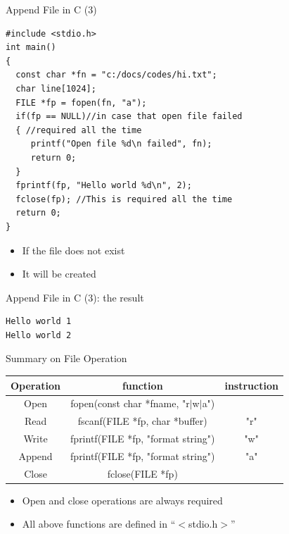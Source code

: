 \begin{frame}[fragile]{Append File in C (3)}
\vspace{-0.15in}
\begin{lstlisting}[xleftmargin=0.06\linewidth, linewidth=0.85\linewidth]
#include <stdio.h>
int main()
{
  const char *fn = "c:/docs/codes/hi.txt";
  char line[1024];
  FILE *fp = fopen(fn, "a");
  if(fp == NULL)//in case that open file failed
  { //required all the time
     printf("Open file %d\n failed", fn);
     return 0;
  }
  fprintf(fp, "Hello world %d\n", 2);
  fclose(fp); //This is required all the time
  return 0;
}
\end{lstlisting}
\begin{itemize}
	\item {If the file does not exist}
	\item {It will be created}
\end{itemize}
\end{frame}

\begin{frame}[fragile]{Append File in C (3): the result}
\vspace{-0.15in}
\begin{lstlisting}
Hello world 1
Hello world 2
\end{lstlisting}
\end{frame}

\begin{frame}[fragile]{Summary on File Operation}
\begin{table}
	\begin{center}
		\begin{tabular}{|c|c|c|} \hline
		Operation & function & instruction \\ \hline
		Open & fopen(const char *fname, "r$|$w$|$a") &  \\ \hline
		Read & fscanf(FILE *fp, char *buffer) & "r" \\ \hline
		Write & fprintf(FILE *fp, "format string") & "w" \\ \hline
		Append & fprintf(FILE *fp, "format string") &  "a"\\ \hline
		Close & fclose(FILE *fp) &  \\ \hline
		\end{tabular}
	\end{center}
\end{table}
\begin{itemize}
	\item {Open and close operations are always required}
	\item {All above functions are defined in ``$<$stdio.h$>$''}
\end{itemize}
\end{frame}